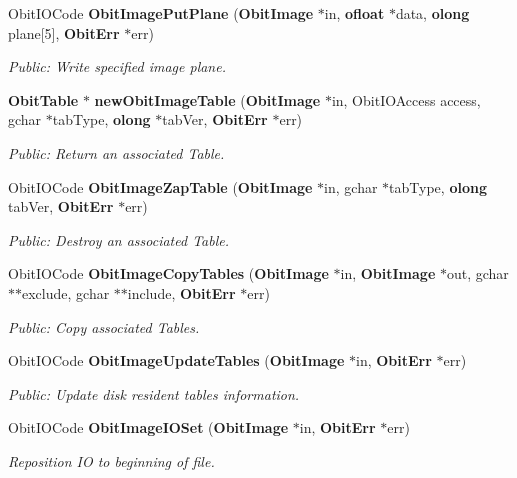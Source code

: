 \begin{CompactItemize}
Obit\-IOCode {\bf Obit\-Image\-Put\-Plane} ({\bf Obit\-Image} $\ast$in, {\bf ofloat} $\ast$data, {\bf olong} plane[5], {\bf Obit\-Err} $\ast$err)
\begin{CompactList}\small\item\em Public: Write specified image plane. \item\end{CompactList}\item 
{\bf Obit\-Table} $\ast$ {\bf new\-Obit\-Image\-Table} ({\bf Obit\-Image} $\ast$in, Obit\-IOAccess access, gchar $\ast$tab\-Type, {\bf olong} $\ast$tab\-Ver, {\bf Obit\-Err} $\ast$err)
\begin{CompactList}\small\item\em Public: Return an associated Table. \item\end{CompactList}\item 
Obit\-IOCode {\bf Obit\-Image\-Zap\-Table} ({\bf Obit\-Image} $\ast$in, gchar $\ast$tab\-Type, {\bf olong} tab\-Ver, {\bf Obit\-Err} $\ast$err)
\begin{CompactList}\small\item\em Public: Destroy an associated Table. \item\end{CompactList}\item 
Obit\-IOCode {\bf Obit\-Image\-Copy\-Tables} ({\bf Obit\-Image} $\ast$in, {\bf Obit\-Image} $\ast$out, gchar $\ast$$\ast$exclude, gchar $\ast$$\ast$include, {\bf Obit\-Err} $\ast$err)
\begin{CompactList}\small\item\em Public: Copy associated Tables. \item\end{CompactList}\item 
Obit\-IOCode {\bf Obit\-Image\-Update\-Tables} ({\bf Obit\-Image} $\ast$in, {\bf Obit\-Err} $\ast$err)
\begin{CompactList}\small\item\em Public: Update disk resident tables information. \item\end{CompactList}\item 
Obit\-IOCode {\bf Obit\-Image\-IOSet} ({\bf Obit\-Image} $\ast$in, {\bf Obit\-Err} $\ast$err)
\begin{CompactList}\small\item\em Reposition IO to beginning of file. \item\end{CompactList}\item 

\end{CompactItemize}
